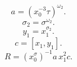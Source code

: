 \[a=(x_0^{-3}\tau)^{\omega_2}.\]
\[\sigma_2=\sigma^{\omega_2}.\]
\[y_1=x_1^{\sigma_2}.\]
\[c=[x_1,y_1].\]
\[R=(x_0^\sigma)^{-1}a\,x_1^2c.\]

